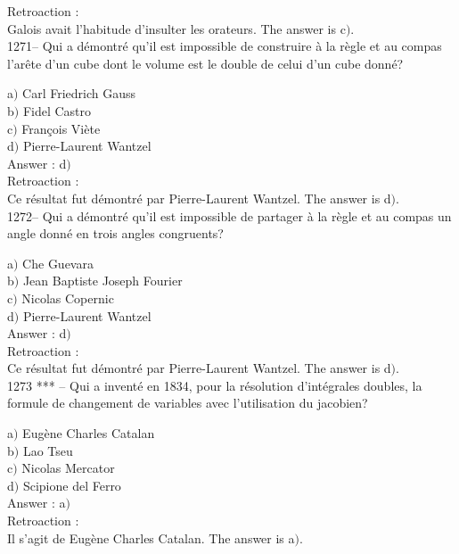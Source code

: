 ﻿\documentclass[letterpaper, 12pt]{article}
\begin{document}
Retroaction : \\
Galois avait l'habitude d'insulter les orateurs.
The answer is c$)$.\\

1271-- Qui a d\'emontr\'e qu'il est impossible de construire \`a la
r\`egle et au compas l'ar\^ete d'un cube dont le volume est le
double de celui d'un cube donn\'e?

a$)$ Carl Friedrich Gauss \\
b$)$ Fidel Castro \\
c$)$ Fran\c cois Vi\`ete \\
d$)$ Pierre-Laurent Wantzel\\

Answer : d$)$\\

Retroaction : \\
Ce r\'esultat fut d\'emontr\'e par Pierre-Laurent Wantzel.
The answer is d$)$.\\

1272-- Qui a d\'emontr\'e qu'il est impossible de partager \`a la
r\`egle et au compas un angle donn\'e en trois angles congruents?

a$)$ Che Guevara \\
b$)$ Jean Baptiste Joseph Fourier \\
c$)$ Nicolas Copernic \\
d$)$ Pierre-Laurent Wantzel\\

Answer : d$)$\\

Retroaction : \\
Ce r\'esultat fut d\'emontr\'e par Pierre-Laurent Wantzel.
The answer is d$)$.\\

1273 *** -- Qui a invent\'e en 1834, pour la r\'esolution
d'int\'egrales doubles, la formule de changement de variables avec
l'utilisation du jacobien?

a$)$ Eug\`ene Charles Catalan \\
b$)$ Lao Tseu \\
c$)$ Nicolas Mercator \\
d$)$ Scipione del Ferro\\

Answer : a$)$\\

Retroaction : \\
Il s'agit de Eug\`ene Charles Catalan.
The answer is a$)$.\\
\end{document}
